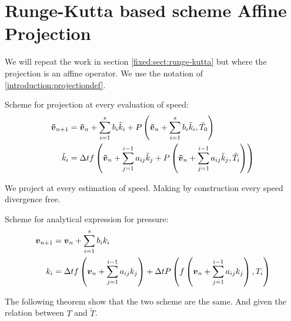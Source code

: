 \section{Runge-Kutta based scheme Affine Projection}
We will repeat the work in section \ref{fixed:sect:runge-kutta} but where the projection is an affine operator.
We use the notation of \ref{introduction:projectiondef}.

Scheme for projection at every evaluation of speed:
\begin{subequations}
\begin{align}
{\boldsymbol {\tilde{v}}}_{n+1}&={\boldsymbol {\tilde{v}}}_{n}+\sum_{i=1}^{s}b_{i}\tilde{k}_{i}+P\left({\boldsymbol {\tilde{v}}}_{n}+\sum_{i=1}^{s}b_{i}\tilde{k}_{i},\tilde{T}_0\right)\\
\tilde{k}_{i}&=\Delta t f\left({\boldsymbol {\tilde{v}}}_{n}+\sum_{j=1}^{i-1}a_{ij}\tilde{k}_{j}+P\left({\boldsymbol {\tilde{v}}}_{n}+\sum_{j=1}^{i-1}a_{ij}\tilde{k}_{j},\tilde{T}_i\right)\right)
\end{align}
\end{subequations}

We project at every estimation of speed. Making by construction every speed divergence free.

Scheme for analytical expression for pressure:
\begin{subequations}
\begin{align}
	{\boldsymbol {v}}_{n+1}&={\boldsymbol {v}}_{n}+\sum_{i=1}^{s}b_{i}k_{i}\\
	k_{i}&=\Delta t f\left({\boldsymbol {v}}_{n}+\sum_{j=1}^{i-1}a_{ij}k_{j}\right)+\Delta t P\left(f\left({\boldsymbol {v}}_{n}+\sum_{j=1}^{i-1}a_{ij}k_{j}\right),T_{i}\right)
\end{align}
\end{subequations}

The following theorem show that the two scheme are the same. And given the relation between $T$ and $\tilde{T}$.

